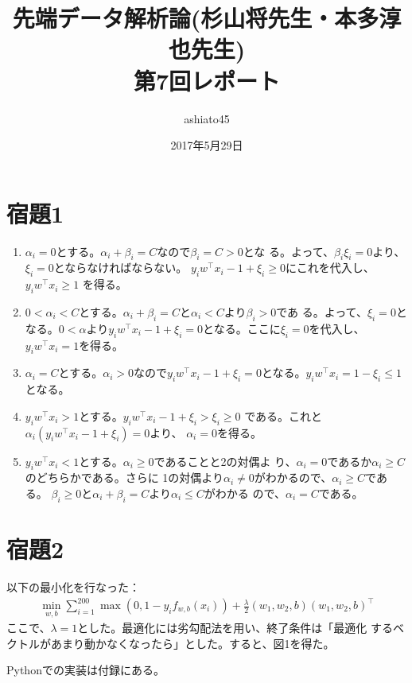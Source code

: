 \documentclass[9pt]{ltjsarticle}
\title{先端データ解析論(杉山将先生・本多淳也先生)\\第7回レポート}
\author{ashiato45}
\date{2017年5月29日}
\begin{document}
\maketitle

\section*{宿題1}
\begin{enumerate}
 \item $\alpha_i=0$とする。$\alpha_i+\beta_i=C$なので$\beta_i=C>0$とな
       る。よって、$\beta_i\xi_i=0$より、$\xi_i=0$とならなければならない。
       $y_iw^\top x_i-1+\xi_i\ge 0$にこれを代入し、$y_iw^\top x_i \ge 1$
       を得る。
 \item $0<\alpha_i<C$とする。$\alpha_i+\beta_i=C$と$\alpha_i<C$より$\beta_i > 0$であ
       る。よって、$\xi_i=0$となる。$0<\alpha$より$y_iw^\top
       x_i-1+\xi_i=0$となる。ここに$\xi_i=0$を代入し、$y_iw^\top x_i =
       1$を得る。
 \item $\alpha_i=C$とする。$\alpha_i>0$なので$y_iw^\top x_i - 1+\xi_i
       = 0$となる。$y_iw^\top x_i = 1-\xi_i\le 1$となる。
 \item $y_iw^\top x_i > 1$とする。$y_iw^\top x_i-1+\xi_i > \xi_i \ge 0$
       である。これと$\alpha_i(y_iw^\top x_i-1+\xi_i)=0$より、
       $\alpha_i=0$を得る。
 \item $y_iw^\top x_i < 1$とする。$\alpha_i\ge 0$であることと2の対偶よ
       り、$\alpha_i=0$であるか$\alpha_i\ge C$のどちらかである。さらに
       1の対偶より$\alpha_i\neq 0$がわかるので、$\alpha_i \ge C$である。
       $\beta_i\ge 0$と$\alpha_i+\beta_i=C$より$\alpha_i \le C$がわかる
       ので、$\alpha_i = C$である。
\end{enumerate}



\section*{宿題2}
以下の最小化を行なった：
\begin{align}
 \min_{w, b} \sum_{i=1}^{200} \max(0, 1-y_i f_{w, b}(x_i)) + \frac{\lambda}{2}(w_1, w_2, b)(w_1, w_2, b)^\top
\end{align}
ここで、$\lambda=1$とした。最適化には劣勾配法を用い、終了条件は「最適化
するベクトルがあまり動かなくなったら」とした。すると、図1を得た。

Pythonでの実装は付録にある。
\end{document}
